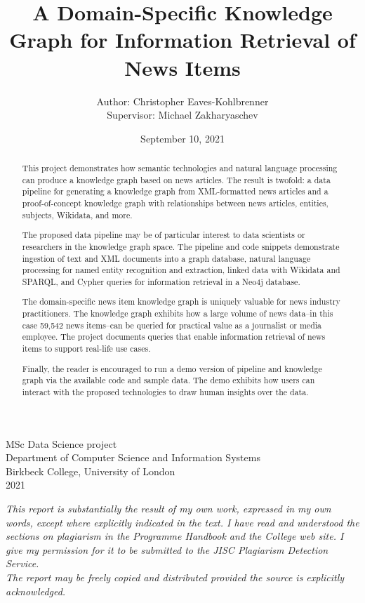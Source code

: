 \documentclass[11pt]{article}
\title{A Domain-Specific Knowledge Graph for Information Retrieval of News Items}
\author{Author: Christopher Eaves-Kohlbrenner \\ Supervisor: Michael Zakharyaschev}
\date{September 10, 2021}
\begin{document}
\maketitle

\begin{center}
\hfill \break
\hfill \break
\hfill \break
MSc Data Science project\\
Department of Computer Science and Information Systems\\
Birkbeck College, University of London\\
2021\\
\hfill \break
\hfill \break
\hfill \break

\textit{This report is substantially the result of my own work, expressed in my own words, except where explicitly indicated in the text. I have read and understood the sections on plagiarism in the Programme Handbook and the College web site. I give my permission for it to be submitted to the JISC Plagiarism Detection Service. \\
\hfill \break
The report may be freely copied and distributed provided the source is explicitly acknowledged.}
\end{center}

\newpage
\begin{abstract}
This project demonstrates how semantic technologies and natural language processing can produce a knowledge graph based on news articles. The result is twofold: a data pipeline for generating a knowledge graph from XML-formatted news articles and a proof-of-concept knowledge graph with relationships between news articles, entities, subjects, Wikidata, and more.

The proposed data pipeline may be of particular interest to data scientists or researchers in the knowledge graph space. The pipeline and code snippets demonstrate ingestion of text and XML documents into a graph database, natural language processing for named entity recognition and extraction, linked data with Wikidata and SPARQL, and Cypher queries for information retrieval in a Neo4j database.

The domain-specific news item knowledge graph is uniquely valuable for news industry practitioners. The knowledge graph exhibits how a large volume of news data--in this case 59,542 news items--can be queried for practical value as a journalist or media employee. The project documents queries that enable information retrieval of news items to support real-life use cases.

Finally, the reader is encouraged to run a demo version of pipeline and knowledge graph via the available code and sample data. The demo exhibits how users can interact with the proposed technologies to draw human insights over the data.


\end{abstract}
\end{document}
